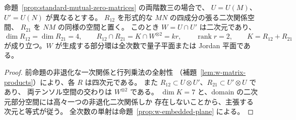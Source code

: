 \begin{proposition}
\label{prop:standard-crossed-common-plane}
命題~\ref{prop:standard-mutual-zero-matrices} の両階数三の場合で、
$U=U(M)$、$U'=U(N)$ が異なるとする。
$R_{12}$ を形式的な $MN$ の四成分の張る二次関係空間、
$R_{21}$ を $NM$ の同様の空間と置く。
このとき $W=U\cap U'$ は二次元であり、
\[
 \dim R_{12}=\dim R_{21}=4,\qquad
 R_{12}\cap R_{21}=K\cap W^{\otimes2}=kr,\qquad
 \operatorname{rank}r=2,\qquad K=R_{12}+R_{21}
\]
が成り立つ。$W$ が生成する部分環は全次数で量子平面または Jordan 平面である。
\end{proposition}
\begin{proof}
前命題の非退化な一次関係と行列乗法の全射性
（補題~\ref{lem:w-matrix-products}）により、各 $R$ は四次元である。
また $R_{12}\subset U\otimes U'$、$R_{21}\subset U'\otimes U$ であり、
両テンソル空間の交わりは $W^{\otimes2}$ である。
$\dim K=7$ と、domain の二次元部分空間には高々一つの非退化二次関係しか
存在しないことから、主張する次元と等式が従う。
全次数の単射は命題~\ref{prop:w-embedded-plane} による。
\end{proof}

